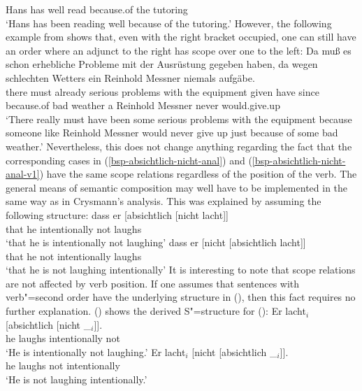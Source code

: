 \begin{enumerate}
{{	 Hans has well read because.of the tutoring\\
\glt `Hans has been reading well because of the tutoring.'
}
\zl
However, the following example from \citet[]{Crysmann2004a} shows that, even with the right bracket occupied, one can still have an
order where an adjunct to the right has scope over one to the left:
\ea
\gll Da muß es schon erhebliche Probleme mit der Ausrüstung gegeben haben, da wegen schlechten
  Wetters ein Reinhold Messner niemals aufgäbe.\\
  there must \expl{} already serious problems with the equipment given have since because.of bad weather a Reinhold Messner never
  would.give.up\\
 \glt `There really must have been some serious problems with the equipment because someone like Reinhold Messner would never give
  up just because of some bad weather.'
\z
Nevertheless, this does not change anything regarding the fact that the corresponding cases in (\ref{bsp-absichtlich-nicht-anal}) 
and (\ref{bsp-absichtlich-nicht-anal-v1}) have the same scope relations regardless of the position of the verb. The general means of semantic
composition may well have to be implemented in the same way as in Crysmann's analysis.%
}
This was explained by assuming the following structure:
\eal
\label{bsp-absichtlich-nicht-anal}
\ex 
\gll dass er [absichtlich [nicht lacht]]\\
     that he \spacebr{}intentionally \spacebr{}not laughs\\
\glt `that he is intentionally not laughing'
\ex 
\gll dass er [nicht [absichtlich lacht]]\\
     that he \spacebr{}not \spacebr{}intentionally laughs\\
\glt `that he is not laughing intentionally'
\zl
It is interesting to note that scope relations are not affected by verb position. If one assumes that sentences with verb"=second
order have the underlying structure in (), then this fact requires no further explanation. () shows
the derived S"=structure for ():
\eal
\label{bsp-absichtlich-nicht-anal-v1}
\ex 
\gll Er lacht$_i$ [absichtlich [nicht \_$_i$]].\\
     he laughs \spacebr{}intentionally \spacebr{}not\\
\glt `He is intentionally not laughing.'
\ex 
\gll Er lacht$_i$  [nicht [absichtlich \_$_i$]].\\
     he laughs \spacebr{}not \spacebr{}intentionally\\
\glt `He is not laughing intentionally.'
\zl{}
\nocite{Hoehle88a,Hoehle97a}
\end{enumerate}

